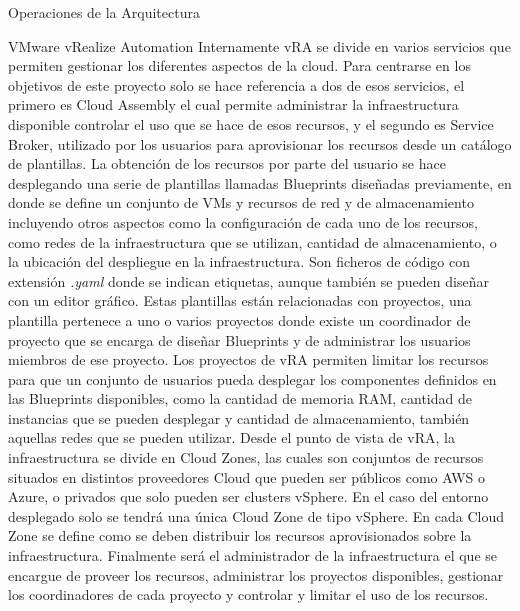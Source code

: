 \begin{subsection}{Operaciones de la Arquitectura}
\begin{subsubsection}{VMware vRealize Automation}
        Internamente vRA se divide en varios servicios que permiten gestionar los diferentes aspectos de la cloud. Para centrarse en los objetivos de este proyecto solo se hace referencia a dos de esos servicios, el primero es Cloud Assembly el cual permite administrar la infraestructura disponible controlar el uso que se hace de esos recursos, y el segundo es Service Broker, utilizado por los usuarios para aprovisionar los recursos desde un catálogo de plantillas. La obtención de los recursos por parte del usuario se hace desplegando una serie de plantillas llamadas Blueprints diseñadas previamente, en donde se define un conjunto de VMs y recursos de red y de almacenamiento incluyendo otros aspectos como la configuración de cada uno de los recursos, como redes de la infraestructura que se utilizan, cantidad de almacenamiento, o la ubicación del despliegue en la infraestructura. Son ficheros de código con extensión \textit{.yaml} donde se indican etiquetas, aunque también se pueden diseñar con un editor gráfico. Estas plantillas están relacionadas con proyectos, una plantilla pertenece a uno o varios proyectos donde existe un coordinador de proyecto que se encarga de diseñar Blueprints y de administrar los usuarios miembros de ese proyecto. Los proyectos de vRA permiten limitar los recursos para que un conjunto de usuarios pueda desplegar los componentes definidos en las Blueprints disponibles, como la cantidad de memoria RAM, cantidad de instancias que se pueden desplegar y cantidad de almacenamiento, también aquellas redes que se pueden utilizar. Desde el punto de vista de vRA, la infraestructura se divide en Cloud Zones, las cuales son conjuntos de recursos situados en distintos proveedores Cloud que pueden ser públicos como AWS o Azure, o privados que solo pueden ser clusters vSphere. En el caso del entorno desplegado solo se tendrá una única Cloud Zone de tipo vSphere. En cada Cloud Zone se define como se deben distribuir los recursos aprovisionados sobre la infraestructura. 
        Finalmente será el administrador de la infraestructura el que se encargue de proveer los recursos, administrar los proyectos disponibles, gestionar los coordinadores de cada proyecto y controlar y limitar el uso de los recursos.


    \end{subsubsection}

    
\end{subsection}